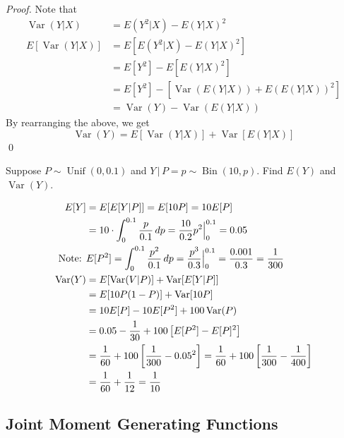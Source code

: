 \documentclass[notoc,notitlepage]{tufte-book}
\DeclareMathOperator{\Bin}{Bin }
\DeclareMathOperator{\Unif}{Unif }
\DeclareMathOperator{\Var}{Var }
\begin{document}
\begin{proof}
  Note that
  \begin{align*}
    \Var(Y | X) &= E( Y^2 | X ) - E( Y | X )^2 \\
    E[ \Var(Y | X) ] &= E[ E( Y^2 | X ) - E( Y|X )^2 ] \\
      &= E[Y^2] - E [ E(Y|X)^2 ] \\
      &= E[Y^2] - \left[ \Var( E(Y|X) ) + E \left( E(Y|X) \right)^2 \right] \\
      &= \Var(Y) - \Var( E(Y | X) )
  \end{align*}
  By rearranging the above, we get
  \begin{equation*}
    \Var(Y) = E[ \Var(Y|X) ] + \Var[ E(Y|X) ]
  \end{equation*}\qed
\end{proof}

\begin{eg}
  Suppose $P \sim \Unif(0, 0.1)$ and $Y \, | \, P = p \sim \Bin(10, p)$. Find $E(Y)$ and $\Var(Y)$.
\end{eg}

\begin{solution}
  \begin{align*}
    E[Y] &= E[ E[Y|P] ] = E[ 10P ] = 10 E[P] \\
      &= 10 \cdot \int_{0}^{0.1} \frac{p}{0.1} \dif{p} = \frac{10}{0.2} p^2 \at{0}{0.1} = 0.05 \\
    \text{Note: }& E[P^2] = \int_{0}^{0.1} \frac{p^2}{0.1} \dif{p} = \frac{p^3}{0.3}\at{0}{0.1} = \frac{0.001}{0.3} = \frac{1}{300} \\
    \Var(Y) &= E[ \Var(V|P) ] + \Var[ E[Y|P] ] \\
      &= E[ 10P(1 - P) ] + \Var[ 10P ] \\
      &= 10E[P] - 10E[P^2] + 100 \Var(P) \\
      &= 0.05 - \frac{1}{30} + 100 \left[ E[P^2] - E[P]^2 \right] \\
      &= \frac{1}{60} + 100 \left[ \frac{1}{300} - 0.05^2 \right] = \frac{1}{60} + 100 \left[ \frac{1}{300} - \frac{1}{400} \right] \\
      &= \frac{1}{60} + \frac{1}{12} = \frac{1}{10}
  \end{align*}
\end{solution}


\subsection{Joint Moment Generating Functions}%
\label{sub:joint_moment_generating_functions}
\end{document}
